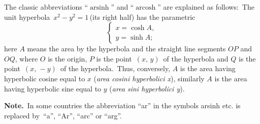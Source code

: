 \documentclass[12pt]{article}
\DeclareMathOperator{\arsinh}{arsinh}
\DeclareMathOperator{\arcosh}{arcosh}
\begin{document}
The classic abbreviations ``$\arsinh$'' and ``$\arcosh$'' are explained as follows:\, The unit hyperbola\, $x^2\!-\!y^2 = 1$\,(its right half) has the parametric 
\[\begin{cases}       
        x = \cosh A,\\
        y = \sinh A;
\end{cases}\]
here $A$ means the area  by the hyperbola and the straight line segments $OP$ and $OQ$, where $O$ is the origin, $P$ is the point \,$(x,\,y)$\, of the hyperbola and $Q$ is the point\, $(x,\,-y)$\, of the hyperbola.\, Thus, conversely, $A$ is the area having hyperbolic cosine equal to $x$ ({\em area cosini hyperbolici x}), similarly $A$ is the area having hyperbolic sine equal to $y$ ({\em area sini hyperbolici y}).

{\bf Note.}\, In some countries the abbreviation ``ar'' in the symbols arsinh etc. is replaced by\, ``a'', ``Ar'', ``arc'' or ``arg''.
\end{document}
